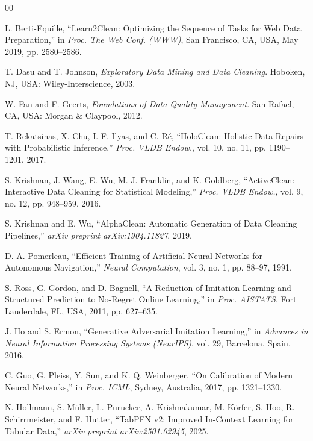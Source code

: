 \documentclass[conference]{IEEEtran}
\begin{document}
\begin{thebibliography}{00}

L. Berti-Equille, ``Learn2Clean: Optimizing the Sequence of Tasks for
Web Data Preparation,'' in \textit{Proc. The Web Conf. (WWW)},
San Francisco, CA, USA, May 2019, pp. 2580--2586.

T. Dasu and T. Johnson, \textit{Exploratory Data Mining and Data Cleaning}.
Hoboken, NJ, USA: Wiley-Interscience, 2003.

W. Fan and F. Geerts, \textit{Foundations of Data Quality Management}.
San Rafael, CA, USA: Morgan \& Claypool, 2012.

T. Rekatsinas, X. Chu, I. F. Ilyas, and C. Ré, ``HoloClean: Holistic
Data Repairs with Probabilistic Inference,'' \textit{Proc. VLDB Endow.},
vol. 10, no. 11, pp. 1190--1201, 2017.

S. Krishnan, J. Wang, E. Wu, M. J. Franklin, and K. Goldberg,
``ActiveClean: Interactive Data Cleaning for Statistical Modeling,''
\textit{Proc. VLDB Endow.}, vol. 9, no. 12, pp. 948--959, 2016.

S. Krishnan and E. Wu, ``AlphaClean: Automatic Generation of Data
Cleaning Pipelines,'' \textit{arXiv preprint arXiv:1904.11827}, 2019.

D. A. Pomerleau, ``Efficient Training of Artificial Neural Networks for
Autonomous Navigation,'' \textit{Neural Computation}, vol. 3, no. 1,
pp. 88--97, 1991.

S. Ross, G. Gordon, and D. Bagnell, ``A Reduction of Imitation Learning
and Structured Prediction to No-Regret Online Learning,'' in
\textit{Proc. AISTATS}, Fort Lauderdale, FL, USA, 2011, pp. 627--635.

J. Ho and S. Ermon, ``Generative Adversarial Imitation Learning,'' in
\textit{Advances in Neural Information Processing Systems (NeurIPS)},
vol. 29, Barcelona, Spain, 2016.

C. Guo, G. Pleiss, Y. Sun, and K. Q. Weinberger, ``On Calibration of
Modern Neural Networks,'' in \textit{Proc. ICML}, Sydney, Australia,
2017, pp. 1321--1330.

N. Hollmann, S. Müller, L. Purucker, A. Krishnakumar, M. Körfer,
S. Hoo, R. Schirrmeister, and F. Hutter, ``TabPFN v2: Improved
In-Context Learning for Tabular Data,'' \textit{arXiv preprint
arXiv:2501.02945}, 2025.


\end{thebibliography}
\end{document}
